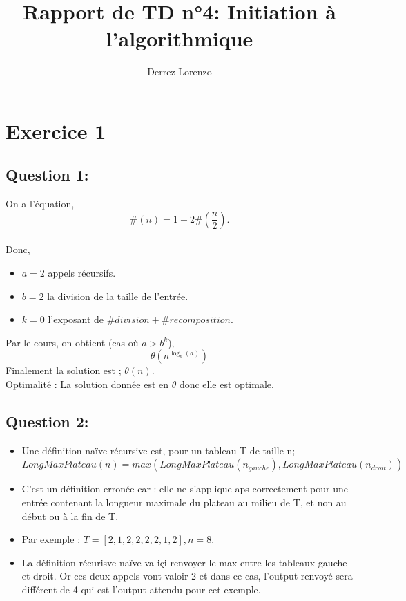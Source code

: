 \documentclass{article}
\title{\textbf{Rapport de TD n°4: Initiation à l'algorithmique}}
\author{Derrez Lorenzo}
\begin{document}
\maketitle

\section*{\textbf{Exercice 1}}

\subsection*{Question 1:}

On a l'équation,
\[
    \# (n) = 1 + 2 \# (\frac{n}{2}).
\]
\\[0.3em]
Donc, 
\begin{itemize}
    \item $ a = 2 $ appels récursifs.
    \item $ b = 2 $ la division de la taille de l'entrée.
    \item $ k = 0 $ l'exposant de $ \# division + \# recomposition $.
\end{itemize}
Par le cours, on obtient (cas où $a>b^k$), 
\[
    \theta(n^{\log_b(a)})
\]
Finalement la solution est ; $ \theta(n) $.
\\[0.3em]
Optimalité : La solution donnée est en $\theta$ donc elle est optimale.

\subsection*{Question 2:}


\begin{itemize}
    \item Une définition naïve récursive est, pour un tableau T de taille n;
    \subitem $ \textit{LongMaxPlateau}(n) = max(\textit{LongMaxPlateau}(n_{gauche}), \textit{LongMaxPlateau}(n_{droit})) $
    \item C'est un définition erronée car : 
    \subitem elle ne s'applique aps correctement pour une entrée contenant la longueur maximale du plateau au milieu de T, et non au début ou à la fin de T.
    \item Par exemple : $ T = [2, 1, 2, 2, 2, 2, 1, 2], n = 8. $
    \item La définition récurisve naïve va içi renvoyer le max entre les tableaux gauche et droit. Or ces deux appels vont valoir 2 et dans ce cas, l'output renvoyé sera différent de 4 qui est l'output attendu pour cet exemple.
\end{itemize}
\end{document}
